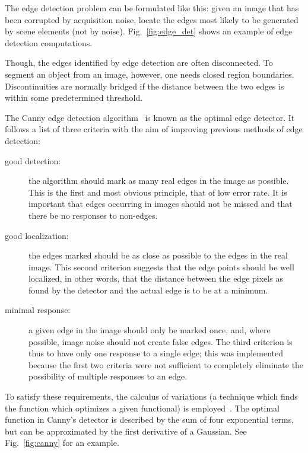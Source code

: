 The edge detection problem can be formulated like this: given an image that has been corrupted by acquisition noise, locate the edges most likely to be generated by scene elements (not by noise). Fig.~\ref{fig:edge_det} shows an example of edge detection computations.

Though, the edges identified by edge detection are often disconnected. To segment an object from an image, however, one needs closed region boundaries. Discontinuities are normally bridged if the distance between the two edges is within some predetermined threshold.

The Canny edge detection algorithm~\cite{canny:1986}  is known as the optimal edge detector. It follows a list of three criteria with the aim of improving previous methods of edge detection:

\begin{description}
\item[good detection:] the algorithm should mark as many real edges in the image as possible. This is the first and most obvious principle, that of low error rate. It is important that edges occurring in images should not be missed and that there be no responses to non-edges.

\item[good localization:] the edges marked should be as close as possible to the edges in the real image. This second criterion suggests that the edge points should be well localized, in other words, that the distance between the edge pixels as found by the detector and the actual edge is to be at a minimum.

\item[minimal response:] a given edge in the image should only be marked once, and, where possible, image noise should not create false edges. The third criterion is thus to have only one response to a single edge; this was implemented because the first two criteria were not sufficient to completely eliminate the possibility of multiple responses to an edge.
\end{description}

To satisfy these requirements, the calculus of variations  (a technique which finds the function which optimizes a given functional) is employed~\cite{canny:1986}. The optimal function in Canny's detector is described by the sum of four exponential terms, but can be approximated by the first derivative of a Gaussian. See Fig.~\ref{fig:canny} for an example.

